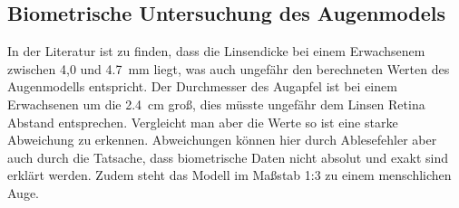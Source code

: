 \subsection{Biometrische Untersuchung des Augenmodels}
In der Literatur \cite{wiki} ist zu finden, dass die Linsendicke bei einem Erwachsenem
zwischen 4,0 und \SI{4.7}{\milli\meter} liegt, was auch ungefähr den berechneten
Werten des Augenmodells entspricht. Der Durchmesser des Augapfel ist bei
einem Erwachsenen um die \SI{2.4}{\centi\meter} groß, dies müsste ungefähr dem
Linsen Retina Abstand entsprechen. Vergleicht man aber die Werte so ist eine
starke Abweichung zu erkennen. Abweichungen können hier durch Ablesefehler aber
auch durch die Tatsache, dass biometrische Daten nicht absolut und exakt sind erklärt werden.
Zudem steht das Modell im Maßstab 1:3 zu einem menschlichen Auge.
